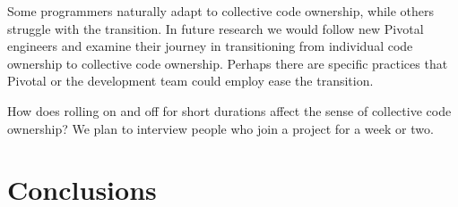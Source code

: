 Some programmers naturally adapt to collective code ownership, while others struggle with the transition. In future research we would follow new Pivotal engineers and examine their journey in transitioning from individual code ownership to collective code ownership. Perhaps there are 
specific practices that Pivotal or the development team could employ ease the transition. 

How does rolling on and off for short durations affect the sense of collective code ownership? We plan to interview people who join a project for a week or two. 


\section{Conclusions}


